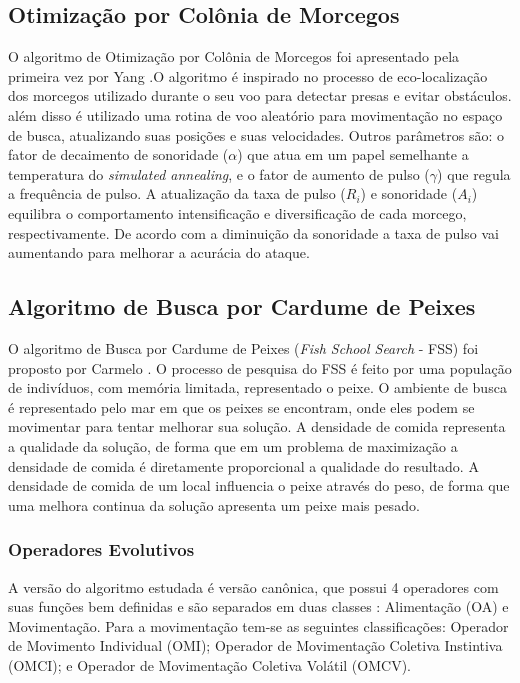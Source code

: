 \subsection{Otimização por Colônia de Morcegos}
\label{sec:bat_algorithm}
O algoritmo de Otimização por Colônia de Morcegos foi apresentado pela primeira vez por Yang \cite{bat}.O algoritmo é inspirado no processo de eco-localização dos morcegos utilizado durante o seu voo para detectar presas e evitar obstáculos. além disso é utilizado uma rotina de voo aleatório para movimentação no espaço de busca, atualizando suas posições e suas velocidades. Outros parâmetros são: o fator de decaimento de sonoridade ($\alpha$) que atua em um papel semelhante a temperatura do \textit{simulated annealing}, e o fator de aumento de pulso ($\gamma$) que regula a frequência de pulso. A atualização da taxa de pulso ($R_i$) e sonoridade ($A_i$) equilibra o comportamento intensificação e diversificação de cada morcego, respectivamente. De acordo com a diminuição da sonoridade a taxa de pulso vai aumentando para melhorar a acurácia do ataque. 

\subsection{Algoritmo de Busca por Cardume de Peixes}
\label{sec:fish_school_search}
O algoritmo de Busca por Cardume de Peixes (\textit{Fish School Search} - FSS) foi proposto por Carmelo \cite{carmelo2008novel}. O processo de pesquisa do FSS é feito por uma população de indivíduos, com memória limitada, representado o peixe. O ambiente de busca é representado pelo mar em que os peixes se encontram, onde eles podem se movimentar para tentar melhorar sua solução. A densidade de comida representa a qualidade da solução, de forma que em um problema de maximização a densidade de comida é diretamente proporcional a qualidade do resultado. A densidade de comida de um local influencia o peixe através do peso, de forma que uma melhora continua da solução apresenta um peixe mais pesado.

\subsubsection{Operadores Evolutivos}
\label{sec:evolutionary_operators}
A versão do algoritmo estudada é versão canônica, que possui 4 operadores com suas funções bem definidas e são separados em duas classes \cite{c2009influence}: Alimentação (OA) e Movimentação. Para a movimentação tem-se as seguintes classificações: Operador de Movimento Individual (OMI); Operador de Movimentação Coletiva Instintiva (OMCI); e Operador de Movimentação Coletiva Volátil (OMCV).

